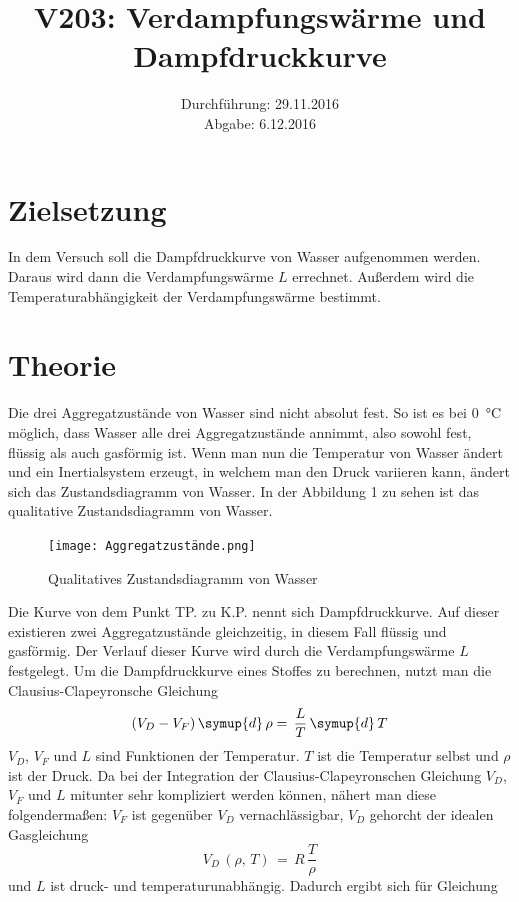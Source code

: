 \documentclass[
  parskip=half,
  bibliography=totoc,     %
  captions=tableheading,  %
  titlepage=firstiscover, %
]{scrartcl}
\title{V203: Verdampfungswärme und Dampfdruckkurve}
\author{
  Simon Schulte \\
  \texorpdfstring{
    \href{mailto:simon.schulte@udo.edu}{simon.schulte@udo.edu}\and}{, }
  Tim Sedlaczek \\
  \texorpdfstring{
    \href{mailto:tim.sedlaczek@udo.edu}{tim.sedlaczek@udo.edu}}{}
}
\date{Durchführung: 29.11.2016\\
      Abgabe: 6.12.2016}
\begin{document}
\newpage
\maketitle
\tableofcontents
\newpage

\section{Zielsetzung}
\label{sec:zielsetzung}
In dem Versuch soll die Dampfdruckkurve von Wasser aufgenommen werden. Daraus
wird dann die Verdampfungswärme $L$ errechnet. Außerdem wird die
Temperaturabhängigkeit der Verdampfungswärme bestimmt.
\section{Theorie}
\label{sec:theorie}
Die drei Aggregatzustände von Wasser sind nicht absolut fest. So ist es bei
\SI{0}{\celsius} möglich, dass Wasser alle drei Aggregatzustände annimmt, also
sowohl fest, flüssig als auch gasförmig ist. Wenn man nun die Temperatur von
Wasser ändert und ein Inertialsystem erzeugt, in welchem man den Druck variieren
kann, ändert sich das Zustandsdiagramm von Wasser. In der Abbildung 1 zu sehen
ist das qualitative Zustandsdiagramm von Wasser.
\begin{figure}[htb]
  \centering
  \texttt{[image: Aggregatzustände.png]}
  \caption{Qualitatives Zustandsdiagramm von Wasser}
  \label{fig:aggregatzustände}
\end{figure}
Die Kurve von dem Punkt TP. zu K.P. nennt sich Dampfdruckkurve. Auf dieser
existieren zwei Aggregatzustände gleichzeitig, in diesem Fall flüssig und
gasförmig. Der Verlauf dieser Kurve wird durch die Verdampfungswärme $L$
festgelegt.
Um die Dampfdruckkurve eines Stoffes zu berechnen, nutzt man die
Clausius-Clapeyronsche Gleichung
\begin{equation}
  (V_D-V_F)\,\symup{d}\,\rho=\,\frac{L}{T}\,\symup{d}\,T
\end{equation}
\label{eq:formel1}
$V_D$, $V_F$ und $L$ sind Funktionen der Temperatur. $T$ ist die Temperatur
selbst und $\rho$ ist der Druck. Da bei der Integration der Clausius-Clapeyronschen
Gleichung $V_D$, $V_F$ und $L$ mitunter sehr kompliziert werden können, nähert
man diese folgendermaßen:
$V_F$ ist gegenüber $V_D$ vernachlässigbar, $V_D$ gehorcht der idealen
Gasgleichung
\begin{equation}
  V_D\,(\rho,\,T)\,=\,R\,\frac{T}{\rho}
\end{equation}
\label{eq:formel2}
und $L$ ist druck- und temperaturunabhängig. Dadurch ergibt sich für Gleichung
\end{document}
